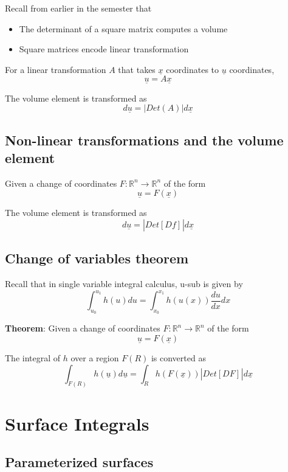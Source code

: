 Recall from earlier in the semester that
\begin{itemize}
   \item The determinant of a square matrix computes a volume
   \item Square matrices encode linear transformation  
\end{itemize}

For a linear transformation $A$ that takes $ \underline{x}$ coordinates to $ \underline{u} $ coordinates, 
\[
  \underline{u} = A \underline{x}
\] 

The volume element is transformed as 
\[
  d \underline{u} = \left| Det \left( A \right)  \right| d \underline{x}
\] 


\subsection{Non-linear transformations and the volume element}
Given a change of coordinates $F: \mathbb{R}^n \rightarrow \mathbb{R}^n$ of the form 
\[
  \underline{ u} = F \left(  \underline{x} \right)
\] 

The volume element is transformed as
\[
   d \underline{u} = \left| Det \left[ D f \right]_{}  \right| d \underline{x}
\]  

\subsection{Change of variables theorem}

Recall that in single variable integral calculus, u-sub is given by
\[
   \int_{u_0}^{u_1}  h(u) du = \int_{x_0}^{x_1}  h(u(x)) \frac{du}{dx} dx  
\] 

\begin{framed}
   \textbf{Theorem}: Given a change of coordinates $F: \mathbb{R}^n \rightarrow \mathbb{R}^n$ of the form 
   \[
     \underline{u} = F \left( \underline{x} \right) 
   \] 

   The integral of $h$ over a region $F(R)$ is converted as
    \[
       \int_{F(R)} h \left( \underline{u} \right) d \underline{u} = \int_R h \left( F \left( \underline{x} \right)  \right) \left| Det \left[ D F \right]_{}  \right| d \underline{x}
   \] 
\end{framed}

\section{Surface Integrals}

\subsection{Parameterized surfaces}

